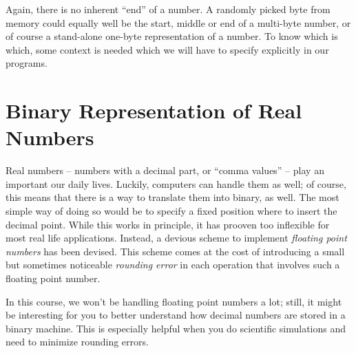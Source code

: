 \begin{warnbox}
Again, there is no inherent \enquote{end} of a number. A randomly picked byte from memory could equally well be the start, middle or end of a multi-byte number, or of course a stand-alone one-byte representation of a number. To know which is which, some context is needed which we will have to specify explicitly in our programs.
\end{warnbox}

\section{Binary Representation of Real Numbers}
Real numbers -- numbers with a decimal part, or \enquote{comma values} -- play an important our daily lives. Luckily, computers can handle them as well; of course, this means that there is a way to translate them into binary, as well. The most simple way of doing so would be to specify a fixed position where to insert the decimal point. While this works in principle, it has prooven too inflexible for most real life applications. Instead, a devious scheme to implement \emph{floating point numbers} has been devised. This scheme comes at the cost of introducing a small but sometimes noticeable \emph{rounding error} in each operation that involves such a floating point number.

In this course, we won't be handling floating point numbers a lot; still, it might be interesting for you to better understand how decimal numbers are stored in a binary machine. This is especially helpful when you do scientific simulations and need to minimize rounding errors.

